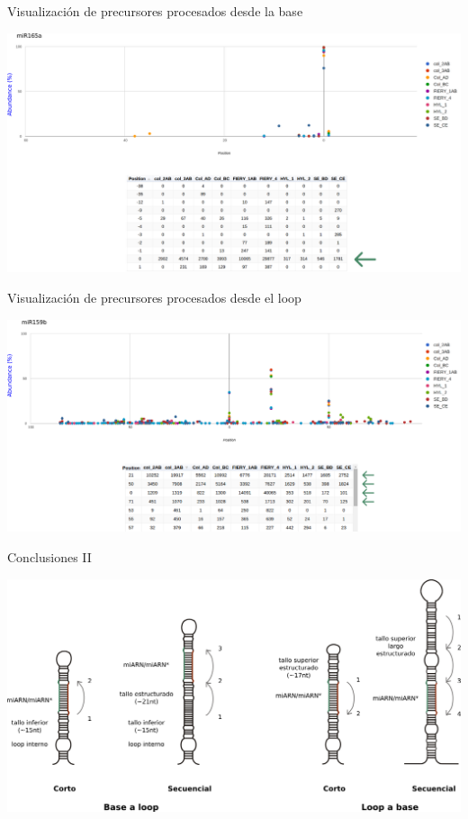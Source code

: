 \documentclass{beamer}
\begin{document}
\begin{frame}{Visualización de precursores procesados desde la base}
	\begin{center}
		\includegraphics[width=1.1\textwidth]{img/miR165a_SPARE.png}
	\end{center}
\end{frame}

\begin{frame}{Visualización de precursores procesados desde el loop}
	\begin{center}
		\includegraphics[width=1.1\textwidth]{img/miR159b_SPARE.png}
	\end{center}
\end{frame}


\begin{frame}{Conclusiones II}
	\begin{center}
		\includegraphics[width=1\textwidth]{img/mecanismos_conclusionII.png}
	\end{center}
\end{frame}
\end{document}
